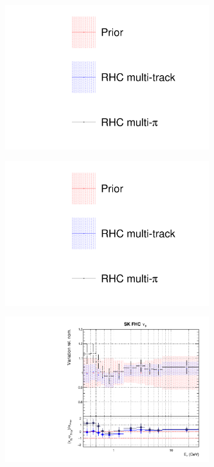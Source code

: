 \begin{figure}[t]
\centering
\begin{subfigure}{0.3\textwidth}
  \centering
  \includegraphics[width=1.0\linewidth, trim={5mm  130mm 0mm 10mm}, clip]{figs/rhcmpdat248_leg}	
\end{subfigure}
\begin{subfigure}{0.3\textwidth}
  \centering
  \includegraphics[width=1.0\linewidth, trim={5mm  0mm 0mm 70mm}, clip]{figs/rhcmpdat248_leg}	
\end{subfigure}
\begin{subfigure}{0.45\textwidth}
  \centering
  \includegraphics[width=0.75\linewidth]{figs/rhcmpdat28flux_8}

\end{subfigure}
\end{figure}
